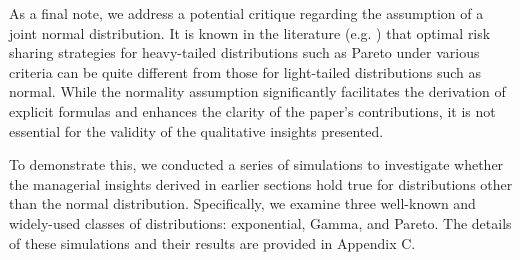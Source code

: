 \documentclass[fleqn,mnsc,nonblindrev]{informs4}
\begin{document}



As a final note, we address a potential critique regarding the assumption of a joint normal distribution. It is known in the literature (e.g. \cite{CHEN2025100003}) that optimal risk sharing strategies for heavy-tailed distributions such as Pareto under various criteria can be quite different from those for light-tailed distributions such as normal. While the normality assumption significantly facilitates the derivation of explicit formulas and enhances the clarity of the paper's contributions, it is not essential for the validity of the qualitative insights presented.

To demonstrate this, we conducted a series of simulations to investigate whether the managerial insights derived in earlier sections hold true for distributions other than the normal distribution. Specifically, we examine three well-known and widely-used classes of distributions: exponential, Gamma, and Pareto. The details of these simulations and their results are provided in Appendix C.
\end{document}
